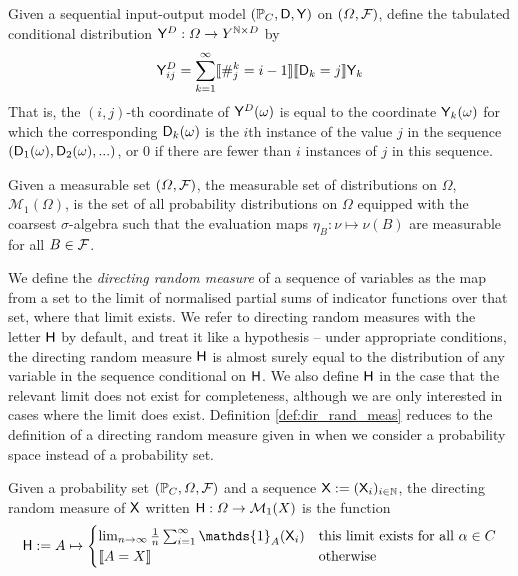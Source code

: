\begin{definition}\label{def:tab_cd}
Given a sequential input-output model $(\mathbb{P}_C,\mathsf{D},\mathsf{Y})$ on $(\Omega,\mathcal{F})$, define the tabulated conditional distribution $\mathsf{Y}^D:\Omega\to Y^{\mathbb{N}\times D}$ by
\begin{align}
    \mathsf{Y}^D_{ij} = \sum_{k=1}^{\infty} \llbracket \#_j^k = i-1\rrbracket \llbracket \mathsf{D}_k = j \rrbracket \mathsf{Y}_k
\end{align}
That is, the $(i,j)$-th coordinate of $\mathsf{Y}^D(\omega)$ is equal to the coordinate $\mathsf{Y}_k(\omega)$ for which the corresponding $\mathsf{D}_k(\omega)$ is the $i$th instance of the value $j$ in the sequence $(\mathsf{D}_1(\omega),\mathsf{D}_2(\omega),...)$, or 0 if there are fewer than $i$ instances of $j$ in this sequence.
\end{definition}

\begin{definition}
Given a measurable set $(\Omega,\mathcal{F})$, the measurable set of distributions on $\Omega$, $\mathcal{M}_1(\Omega)$, is the set of all probability distributions on $\Omega$ equipped with the coarsest $\sigma$-algebra such that the evaluation maps $\eta_B:\nu\mapsto \nu(B)$ are measurable for all $B\in \mathcal{F}$.
\end{definition}

We define the \emph{directing random measure} of a sequence of variables as the map from a set to the limit of normalised partial sums of indicator functions over that set, where that limit exists. We refer to directing random measures with the letter $\mathsf{H}$ by default, and treat it like a hypothesis -- under appropriate conditions, the directing random measure $\mathsf{H}$ is almost surely equal to the distribution of any variable in the sequence conditional on $\mathsf{H}$. We also define $\mathsf{H}$ in the case that the relevant limit does not exist for completeness, although we are only interested in cases where the limit does exist. Definition \ref{def:dir_rand_meas} reduces to the definition of a directing random measure given in \citet{kallenberg_basic_2005} when we consider a probability space instead of a probability set.

\begin{definition}\label{def:dir_rand_meas}
Given a probability set $(\mathbb{P}_C,\Omega,\mathcal{F})$ and a sequence $\mathsf{X}:=(\mathsf{X}_i)_{i\in\mathbb{N}}$, the directing random measure of $\mathsf{X}$ written $\mathsf{H}:\Omega\to \mathcal{M}_1(X)$ is the function
\begin{align}
    \RV{H} := A \mapsto \begin{cases}
    \lim_{n\to \infty}\frac{1}{n} \sum_{i=1}^{\infty} \mathds{1}_{A}(\RV{X}_{i}) & \text{this limit exists for all }\alpha\in C\\
    \llbracket A = X \rrbracket &\text{otherwise}
    \end{cases} 
\end{align}
\end{definition}

